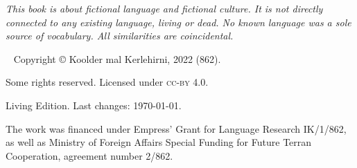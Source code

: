 \begin{fullwidth}

\emph{This book is about fictional language and fictional culture. It is not
directly connected to any existing language, living or dead. No known language
was a sole source of vocabulary. All similarities are coincidental.}

~\vfill
\thispagestyle{empty}
\setlength{\parindent}{0pt}
\setlength{\parskip}{\baselineskip}
Copyright © Koolder mal Kerlehirni, 2022 (862).

\bigskip

Some rights reserved. Licensed under \textsc{cc-by} 4.0.

Living Edition. Last changes: \today{}.

\medskip

The work was financed under Empress' Grant for Language Research IK/1/862,
as well as Ministry of Foreign Affairs Special Funding for Future Terran
Cooperation, agreement number 2/862.

\end{fullwidth}